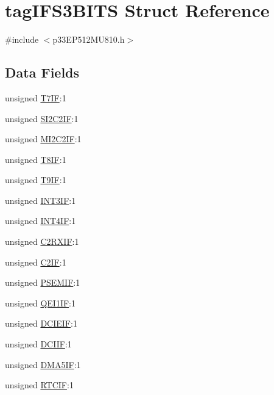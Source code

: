\hypertarget{structtag_i_f_s3_b_i_t_s}{}\section{tag\+I\+F\+S3\+B\+I\+TS Struct Reference}
\label{structtag_i_f_s3_b_i_t_s}


{\ttfamily \#include $<$p33\+E\+P512\+M\+U810.\+h$>$}

\subsection*{Data Fields}
\begin{DoxyCompactItemize}
\item 
unsigned \hyperlink{structtag_i_f_s3_b_i_t_s_ab4eaccae46ba8be19b4bf14dad63264d}{T7\+IF}\+:1
\item 
unsigned \hyperlink{structtag_i_f_s3_b_i_t_s_a545c58207538b135f1ff764fa7deb1f0}{S\+I2\+C2\+IF}\+:1
\item 
unsigned \hyperlink{structtag_i_f_s3_b_i_t_s_a7243eae552bc8233f8a43b44bbac9582}{M\+I2\+C2\+IF}\+:1
\item 
unsigned \hyperlink{structtag_i_f_s3_b_i_t_s_a0dd36655e32cad22d033bce161525445}{T8\+IF}\+:1
\item 
unsigned \hyperlink{structtag_i_f_s3_b_i_t_s_a5443cbecb88151f8b0b6b4fc324b60ce}{T9\+IF}\+:1
\item 
unsigned \hyperlink{structtag_i_f_s3_b_i_t_s_a917432a28862fb746adcad446539d9e6}{I\+N\+T3\+IF}\+:1
\item 
unsigned \hyperlink{structtag_i_f_s3_b_i_t_s_a2af883479f81a6b9ddb75b041411da8f}{I\+N\+T4\+IF}\+:1
\item 
unsigned \hyperlink{structtag_i_f_s3_b_i_t_s_a84688f53336bb09b462d7f4f5478266c}{C2\+R\+X\+IF}\+:1
\item 
unsigned \hyperlink{structtag_i_f_s3_b_i_t_s_abeeba71a326b51099861104b8a0a96e7}{C2\+IF}\+:1
\item 
unsigned \hyperlink{structtag_i_f_s3_b_i_t_s_aa05218d9baef6c45a333b6b1c65842f2}{P\+S\+E\+M\+IF}\+:1
\item 
unsigned \hyperlink{structtag_i_f_s3_b_i_t_s_a9d9921cba47c54f7194ceb75ce7f58d2}{Q\+E\+I1\+IF}\+:1
\item 
unsigned \hyperlink{structtag_i_f_s3_b_i_t_s_a4431d4c8070061ae59b6c9f7c6fd8d1f}{D\+C\+I\+E\+IF}\+:1
\item 
unsigned \hyperlink{structtag_i_f_s3_b_i_t_s_a30a4cd02f7a16e63ae44488d9182b6c9}{D\+C\+I\+IF}\+:1
\item 
unsigned \hyperlink{structtag_i_f_s3_b_i_t_s_a93e926ab5af4a601ad3250eaf7df4736}{D\+M\+A5\+IF}\+:1
\item 
unsigned \hyperlink{structtag_i_f_s3_b_i_t_s_a6ed23c7a50fb902412ba5951de45bc64}{R\+T\+C\+IF}\+:1
\end{DoxyCompactItemize}


